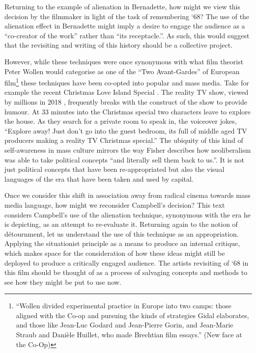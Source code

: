 \documentclass[12pt]{article}
\begin{document}
Returning to the example of alienation in Bernadette, how might we view this decision by the filmmaker in light of the task of remembering `68? The use of the alienation effect in Bernadette might imply a desire to engage the audience as a ``co-creator of the work'' rather than ``its receptacle.''\cite{Walsh:1981aa}. As such, this would suggest that the revisiting and writing of this history should be a collective project. 

However, while these techniques were once synonymous with what film theorist Peter Wollen \citeyear{Wollen:1975aa} would categorise as one of the ``Two Avant-Gardes'' of European film\footnote{``Wollen divided experimental practice in Europe into two camps: those aligned with the Co-op and pursuing the kinds of strategies Gidal elaborates, and those like Jean-Luc Godard and Jean-Pierre Gorin, and Jean-Marie Straub and Danièle Huillet, who made Brechtian film essays.'' (New face at the Co-Op)}  these techniques have been co-opted into popular and mass media. Take for example the recent Christmas Love Island Special \citeyear{Love:2018aa}. The reality TV show, viewed by millions in 2018 , frequently breaks with the construct of the show to provide humour. At 33 minutes into the Christmas special two characters leave to explore the house. As they search for a private room to speak in, the voiceover jokes, ``Explore away! Just don't go into the guest bedroom, its full of middle aged TV producers making a reality TV Christmas special.'' The ubiquity of this kind of self-awareness in mass culture mirrors the way Fisher describes how neoliberalism was able to take political concepts  ``and literally sell them back to us.''\cite{Fisher:2012aa}. It is not just political concepts that have been re-appropriated but also the visual languages of the era that have been taken and used by capital.

Once we consider this shift in association away from radical cinema towards mass media language, how might we reconsider Campbell's decision? This text considers Campbell's use of the alienation technique, synonymous with the era he is depicting, as an attempt to re-evaluate it. Returning again to the notion of d\'{e}tournment, let us understand the use of this technique as an appropriation. Applying the situationist principle as a means to produce an internal critique, which makes space for the consideration of how these ideas might still be deployed to produce a critically engaged audience. The artists revisiting of `68 in this film should be thought of as a process of salvaging concepts and methods to see how they might be put to use now. 
\end{document}
